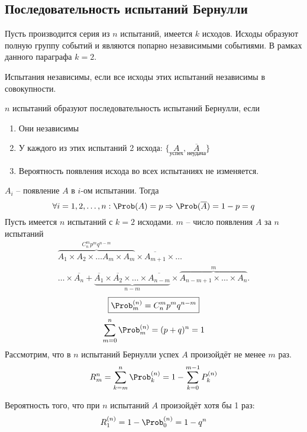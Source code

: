 \subsection{Последовательность испытаний Бернулли}
Пусть производится серия из $n$ испытаний, имеется $k$ исходов. Исходы образуют полную группу событий и являются попарно независимыми событиями. В рамках данного параграфа $k = 2$.
\begin{definition}
	Испытания независимы, если все исходы этих испытаний независимы в совокупности.
\end{definition}
\begin{definition}
	$n$ испытаний образуют последовательность испытаний Бернулли, если
	\begin{enumerate}
		\item Они независимы
		\item У каждого из этих испытаний 2 исхода: $\{\underset{\text{успех}}{A}, \underset{\text{неудача}}{\overline{A}} \}$
		\item Вероятность появления исхода во всех испытаниях не изменяется.
	\end{enumerate}
\end{definition}
$A_i$ -- появление $A$ в $i$-ом испытании. Тогда
\[ \forall i=\To n : \Prob(A) = p \Rightarrow \Prob(\overline{A}) = 1 - p = q \]
Пусть имеется $n$ испытаний с $k=2$ исходами. $m$ -- число появления $A$ за $n$ испытаний
\[
	\begin{split}
		\overbrace{A_1 \times A_2 \times \dots A_m \times A_m}^{C_n^m p^m q^{n-m}} \times \overline{A_{m+1}} \times \dots \\
		\ldots \times \overline{A_n} + \underbrace{\overline{A_1} \times \overline{A_2} \times \dots \times \overline{A_{n-m}}}_{n-m} \times \overbrace{A_{n-m+1} \times \ldots \times A_n}^m.
	\end{split}
\]
\[
	\boxed{\Prob_m^{(n)} = C_n^m p^m q^{n-m}}
\]
\[
	\sum\limits_{m=0}^n \Prob_m^{(n)} = (p + q)^n = 1
\]
Рассмотрим, что в $n$ испытаний Бернулли успех $A$ произойдёт не менее $m$ раз.
\[
	R_m^{n} = \sum\limits_{k = m}^n \Prob_k^{(n)} = 1 - \sum\limits_{k=0}^{m-1} P_k^{(n)}
\]
\begin{example}
	Вероятность того, что при $n$ испытаний $A$ произойдёт хотя бы 1 раз:
	\[ R_1^{(n)} = 1 - \Prob_0^{(n)} = 1 - q^n \]
\end{example}
